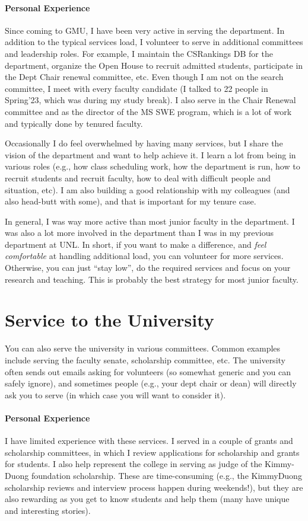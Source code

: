 \documentclass[oneside,11pt,dvipsnames]{book}
\begin{document}
\paragraph{Personal Experience} Since coming to GMU, I have been very active in serving the department.  In addition to the typical services load, I volunteer to serve in additional committees and leadership roles. For example, I maintain the CSRankings DB for the department, organize the Open House to recruit admitted students, participate in the Dept Chair renewal committee, etc.
Even though I am not on the search committee, I meet with every faculty candidate (I talked to 22 people in Spring'23, which was during my study break). I also serve in the Chair Renewal committee and as the director of the MS SWE program, which is a lot of work and typically done by tenured faculty. 


Occasionally I do feel overwhelmed by having many services, but I share the vision of the department and want to help achieve it.
I learn a lot from being in various roles (e.g., how class scheduling work, how the department is run, how to recruit students and recruit faculty, how to deal with difficult people and situation, etc).
I am also building a good relationship with my colleagues (and also head-butt with some), and that is important for my tenure case. 

In general, I was way more active than most junior faculty in the department.  I was also a lot more involved in the department than I was in my previous department at UNL.
In short, if you want to make a difference, and \emph{feel comfortable} at handling additional load, you can volunteer for more services. Otherwise, you can just ``stay low'',
do the required services and focus on your research and teaching. This is probably the best strategy for most junior faculty. 

\section{Service to the University}
You can also serve the university in various committees.
Common examples include serving the faculty senate, scholarship committee, etc. The university often sends out emails asking for volunteers (so somewhat generic and you can safely ignore), and sometimes people (e.g., your dept chair or dean) will directly ask you to serve (in which case you will want to consider it).

\paragraph{Personal Experience} I have limited experience with these services. I served in a couple of grants and scholarship committees, in which I review applications for scholarship and grants for students. I also help represent the college in serving as judge of the Kimmy-Duong foundation scholarship. These are time-consuming (e.g., the KimmyDuong scholarship reviews and interview process happen during weekends!), but they are also rewarding as you get to know students and help them (many have unique and interesting stories). 
\end{document}
